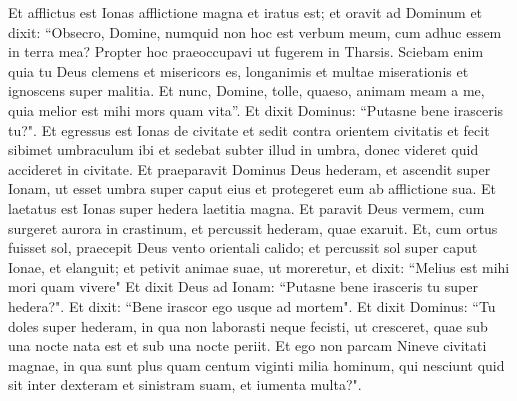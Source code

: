 \begin{biblechapter}   
\verse Et afflictus est Ionas afflictione magna et iratus est; 
\verse et oravit ad Dominum et dixit: “Obsecro, Domine, numquid non hoc est verbum meum, cum adhuc essem in terra mea? Propter hoc praeoccupavi ut fugerem in Tharsis. Sciebam enim quia tu Deus clemens et misericors es, longanimis et multae miserationis et ignoscens super malitia. 
\verse Et nunc, Domine, tolle, quaeso, animam meam a me, quia melior est mihi mors quam vita”. 
\verse Et dixit Dominus: “Putasne bene irasceris tu?". 
\verse Et egressus est Ionas de civitate et sedit contra orientem civitatis et fecit sibimet umbraculum ibi et sedebat subter illud in umbra, donec videret quid accideret in civitate. 
\verse Et praeparavit Dominus Deus hederam, et ascendit super Ionam, ut esset umbra super caput eius et protegeret eum ab afflictione sua. Et laetatus est Ionas super hedera laetitia magna. 
\verse Et paravit Deus vermem, cum surgeret aurora in crastinum, et percussit hederam, quae exaruit. 
\verse Et, cum ortus fuisset sol, praecepit Deus vento orientali calido; et percussit sol super caput Ionae, et elanguit; et petivit animae suae, ut moreretur, et dixit: “Melius est mihi mori quam vivere" 
\verse Et dixit Deus ad Ionam: “Putasne bene irasceris tu super hedera?". Et dixit: “Bene irascor ego usque ad mortem". 
\verse Et dixit Dominus: “Tu doles super hederam, in qua non laborasti neque fecisti, ut cresceret, quae sub una nocte nata est et sub una nocte periit. 
\verse Et ego non parcam Nineve civitati magnae, in qua sunt plus quam centum viginti milia hominum, qui nesciunt quid sit inter dexteram et sinistram suam, et iumenta multa?".    
\end{biblechapter}
